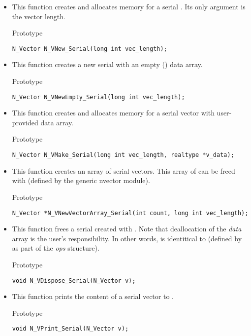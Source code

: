 \begin{itemize}

\item {}

  This function creates and allocates memory for a serial .
  Its only argument is the vector length.

  Prototype

  \verb|N_Vector N_VNew_Serial(long int vec_length);|

\item {}

  This function creates a new serial  with an empty () data array.

  Prototype

  \verb|N_Vector N_VNewEmpty_Serial(long int vec_length);|

\item {}

 This function creates and allocates memory for a serial vector
 with user-provided data array.

 Prototype

 \verb|N_Vector N_VMake_Serial(long int vec_length, realtype *v_data);|


\item {}

 This function creates an array of  serial vectors.
 This array of  can be freed with 
 (defined by the generic nvector module).

 Prototype

 \verb|N_Vector *N_VNewVectorArray_Serial(int count, long int vec_length);|


\item {}

 This function frees a serial  created with .
 Note that deallocation of the {\em data} array is the user's
 responsibility. In other words,  is identitical
 to  (defined by {\nvecs} as part of the {\em ops}
 structure).

 Prototype

 \verb|void N_VDispose_Serial(N_Vector v);|


\item {}

 This function prints the content of a serial vector to .

 Prototype
 
 \verb|void N_VPrint_Serial(N_Vector v);|

\end{itemize}
